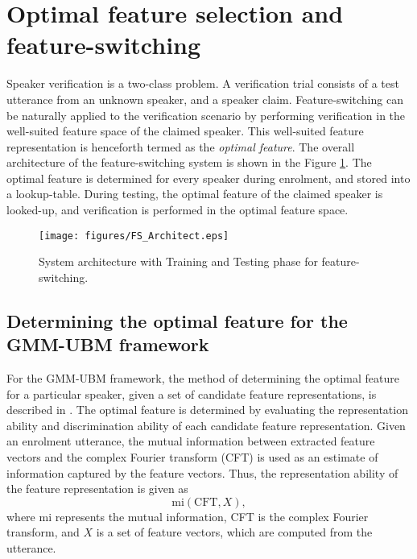 \documentclass{article}
\begin{document}
\section{Optimal feature selection and feature-switching}
\label{sec:optFeat}

Speaker verification is a two-class problem. A verification trial consists of a
test utterance from an unknown speaker, and a speaker claim. Feature-switching
can be naturally applied to the verification scenario by performing
verification in the well-suited feature space of the claimed speaker. This
well-suited feature representation is henceforth termed as the \emph{optimal
feature}. The overall architecture of the feature-switching system is shown in the
Figure \ref{fig:systemArch}. The optimal feature is determined for every speaker
during enrolment, and stored into a lookup-table. During testing, the optimal
feature of the claimed speaker is looked-up, and verification is performed in
the optimal feature space.

\begin{figure}[th]
\centering
\texttt{[image: figures/FS\_Architect.eps]}
\caption{System architecture with Training and Testing phase for feature-switching.}
\label{fig:systemArch}
\end{figure}



\subsection{Determining the optimal feature for the GMM-UBM framework}
\label{subsec:ubm_optFeat}

For the GMM-UBM framework, the method of determining the optimal feature for a
particular speaker, given a set of candidate feature representations, is
described in \cite{padmanInterspeech2010}. The optimal feature is determined by
evaluating the representation ability and discrimination ability
of each candidate feature representation. Given an enrolment utterance, the
mutual information between extracted feature vectors and the complex Fourier
transform (CFT) is used as an estimate of information captured by the feature
vectors. Thus, the representation ability of the feature representation is given
as 
\begin{equation}
\textrm{mi}(\textrm{CFT},X),
\end{equation}
where $\textrm{mi}$ represents the mutual information, CFT is the complex
Fourier transform, and $X$ is a set of feature vectors, which are computed from
the utterance.
\end{document}
